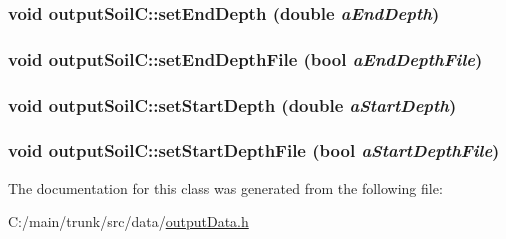 \label{classoutput_soil_c_a78674bb0f37aeb3265f1462076d8ff34}
\hypertarget{classoutput_soil_c_a6e734408a56571cc454abfd26eb2771f}{
\subsubsection[{setEndDepth}]{\setlength{\rightskip}{0pt plus 5cm}void outputSoilC::setEndDepth (double {\em aEndDepth})}}
\label{classoutput_soil_c_a6e734408a56571cc454abfd26eb2771f}
\hypertarget{classoutput_soil_c_a2b003cd1bde427aec963367775c62b7e}{
\subsubsection[{setEndDepthFile}]{\setlength{\rightskip}{0pt plus 5cm}void outputSoilC::setEndDepthFile (bool {\em aEndDepthFile})}}
\label{classoutput_soil_c_a2b003cd1bde427aec963367775c62b7e}
\hypertarget{classoutput_soil_c_a9c4adf898ff78966614b3feeecaf8fc5}{
\subsubsection[{setStartDepth}]{\setlength{\rightskip}{0pt plus 5cm}void outputSoilC::setStartDepth (double {\em aStartDepth})}}
\label{classoutput_soil_c_a9c4adf898ff78966614b3feeecaf8fc5}
\hypertarget{classoutput_soil_c_a7ca2e2d0b308a9189044e80baef2b8db}{
\subsubsection[{setStartDepthFile}]{\setlength{\rightskip}{0pt plus 5cm}void outputSoilC::setStartDepthFile (bool {\em aStartDepthFile})}}
\label{classoutput_soil_c_a7ca2e2d0b308a9189044e80baef2b8db}


The documentation for this class was generated from the following file:\begin{DoxyCompactItemize}
\item 
C:/main/trunk/src/data/\hyperlink{output_data_8h}{outputData.h}\end{DoxyCompactItemize}
